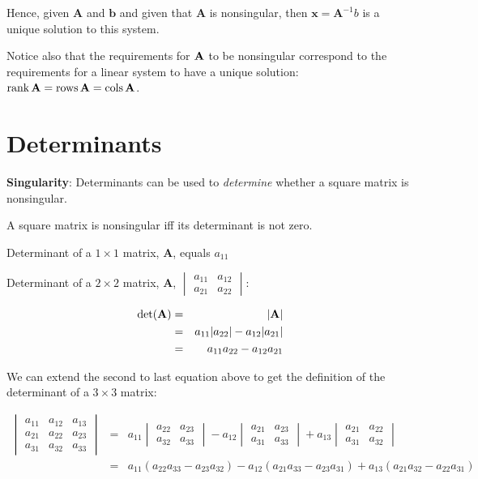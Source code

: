 \documentclass[]{book}
\theoremstyle{definition}
\theoremstyle{definition}
\theoremstyle{definition}
\theoremstyle{remark}
\begin{document}
Hence, given \(\bm{A}\) and \(\bm{b}\) and given that \(\bm{A}\) is
nonsingular, then \(\bm{x} = \bm{A}^{-1} b\) is a unique solution to
this system.

Notice also that the requirements for \({\bf A}\) to be nonsingular
correspond to the requirements for a linear system to have a unique
solution:
\(\mbox{rank\,}{\bf A}=\mbox{rows\,}{\bf A}=\mbox{cols\,}{\bf A}\).

\section{Determinants}\label{determinants}

\textbf{Singularity}: Determinants can be used to \emph{determine}
whether a square matrix is nonsingular.

A square matrix is nonsingular iff its determinant is not zero.

Determinant of a \(1 \times 1\) matrix, \textbf{A}, equals \(a_{11}\)

Determinant of a \(2 \times 2\) matrix, \textbf{A},
\(\begin{vmatrix} a_{11}&a_{12}\\  a_{21}&a_{22} \end{vmatrix}\):

\begin{eqnarray*}
\det({\bf A}) &=& |{\bf A}|\\
            &=& a_{11}|a_{22}| - a_{12}|a_{21}|\\
            &=& a_{11}a_{22} - a_{12}a_{21}
\end{eqnarray*}

We can extend the second to last equation above to get the definition of
the determinant of a \(3 \times 3\) matrix:

\begin{eqnarray*}
            \begin{vmatrix} a_{11}&a_{12}&a_{13}\\  a_{21} & a_{22}&a_{23}\\ a_{31}&a_{32}&a_{33} \end{vmatrix} 
                &=& 
                a_{11} \begin{vmatrix} a_{22}&a_{23}\\ a_{32}&a_{33} \end{vmatrix}
                - a_{12} \begin{vmatrix} a_{21}&a_{23}\\ a_{31}&a_{33} \end{vmatrix}
                + a_{13} \begin{vmatrix} a_{21}&a_{22}\\ a_{31}&a_{32} 
                \end{vmatrix}\\
                &=& a_{11}(a_{22}a_{33} - a_{23}a_{32}) - a_{12}(a_{21}a_{33} - a_{23}a_{31}) + a_{13}(a_{21}a_{32} - a_{22}a_{31})
\end{eqnarray*}
\end{document}
